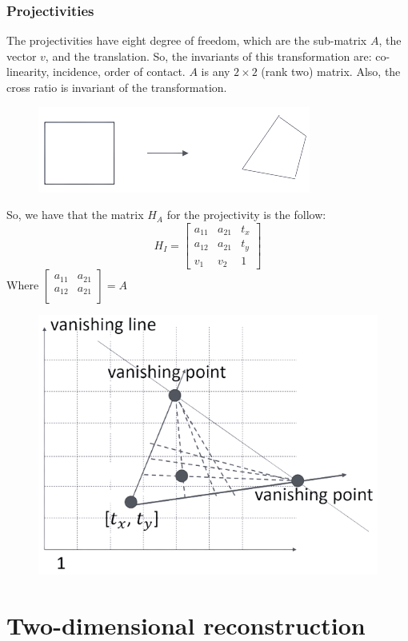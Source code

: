 \documentclass[12pt, a4paper]{report}
\begin{document}
    \subsection{Projectivities}
    The projectivities have eight degree of freedom, which are the sub-matrix $A$, the vector $v$, and the translation. So, the invariants of this transformation are: co-linearity, incidence, order of contact.
    $A$ is any $2 \times 2$ (rank two) matrix. Also, the cross ratio is invariant of the transformation.
    \begin{figure}[H]
        \centering
        \includegraphics[width=0.5\linewidth]{images/projectivities.png}
    \end{figure}
    So, we have that the matrix $H_A$ for the projectivity is the follow: 
    \[H_I=
    \begin{bmatrix}
        a_{11} & a_{21} & t_x \\
        a_{12} & a_{21} & t_y \\
        v_1 & v_2 & 1
    \end{bmatrix}\]
    Where $
    \begin{bmatrix}
        a_{11} & a_{21} \\
        a_{12} & a_{21} \\
    \end{bmatrix}
    =A$
    \begin{figure}[H]
        \centering
        \includegraphics[width=0.5\linewidth]{images/projectivities1.png}
    \end{figure}

\newpage

\chapter{Two-dimensional reconstruction}
\end{document}
